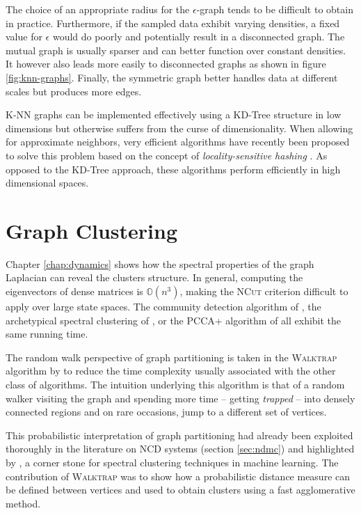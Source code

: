 The choice of an appropriate radius for the $\epsilon$-graph tends to be difficult to obtain in practice. Furthermore, if the sampled data exhibit varying densities, a fixed value for $\epsilon$ would do poorly and potentially result in a disconnected graph. The mutual graph is usually sparser and can better function over constant densities. It however also leads more easily to  disconnected graphs as shown in figure \ref{fig:knn-graphs}. Finally, the symmetric graph better handles data at different scales but produces more edges.  

K-NN graphs can be implemented effectively using a KD-Tree \parencite{Friedman1977}
structure in low dimensions but otherwise suffers from the curse of dimensionality.
When allowing for approximate neighbors, very efficient algorithms have recently
been proposed to solve this problem based on the concept of \textit{locality-sensitive
hashing} \parencite{Andoni2008}. As opposed to the KD-Tree approach, these algorithms perform
efficiently in high dimensional spaces. 

\section{Graph Clustering}
Chapter \ref{chap:dynamics} shows how the spectral properties of the graph Laplacian can reveal the clusters structure. In general, computing the eigenvectors of dense matrices is $\mathbb{O}(n^3)$, making the \textsc{NCut} criterion difficult to apply over large state spaces. The community detection algorithm of \cite{Newman2006}, the archetypical spectral clustering of \cite{Ng2001}, or the \textsc{PCCA+} algorithm of \cite{Deuflhard2005} all exhibit the same running time.

The random walk perspective of graph partitioning is taken in the \textsc{Walktrap} algorithm by \cite{Pons2005} to reduce the time complexity usually associated with the other class of algorithms. The intuition underlying this algorithm is that of a random walker visiting the graph and spending more time -- getting \textit{trapped} -- into densely connected regions and on rare occasions, jump to a different set of vertices.

This probabilistic interpretation of graph partitioning had already been exploited thoroughly in the literature on NCD systems (section \ref{sec:ndmc}) and highlighted by \cite{Shi2001}, a corner stone for spectral clustering techniques in machine learning. The contribution of \textsc{Walktrap} was to show how a probabilistic distance measure can be defined between vertices and used to obtain clusters using a fast agglomerative method.

